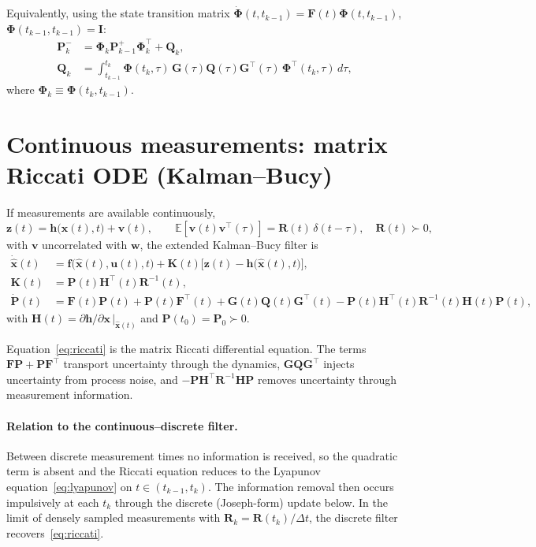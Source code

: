 \documentclass[]{article}
\newcommand{\x}{\bm{x}}
\newcommand{\xh}{\hat{\bm{x}}}
\newcommand{\z}{\bm{z}}
\newcommand{\Pm}{\mathbf{P}}
\newcommand{\Fm}{\mathbf{F}}
\newcommand{\Gm}{\mathbf{G}}
\newcommand{\Hm}{\mathbf{H}}
\newcommand{\Km}{\mathbf{K}}
\newcommand{\Qm}{\mathbf{Q}}
\newcommand{\Rm}{\mathbf{R}}
\newcommand{\Phim}{\bm{\Phi}}
\newcommand{\Id}{\mathbf{I}}
\begin{document}
Equivalently, using the state transition matrix
$\dot{\Phim}(t,t_{k-1}) = \Fm(t)\Phim(t,t_{k-1})$, $\Phim(t_{k-1},t_{k-1})=\Id$:
\begin{align}
  \Pm_k^- &= \Phim_k \Pm_{k-1}^+ \Phim_k^\top + \Qm_k, \\
  \Qm_k   &= \int_{t_{k-1}}^{t_k}
             \Phim(t_k,\tau)\,\Gm(\tau)\Qm(\tau)\Gm^\top(\tau)\,\Phim^\top(t_k,\tau)\,d\tau,
\end{align}
where $\Phim_k \equiv \Phim(t_k,t_{k-1})$.

\section*{Continuous measurements: matrix Riccati ODE (Kalman--Bucy)}
If measurements are available continuously,
\begin{equation}
  \z(t) = \bm{h}\big(\x(t),t\big) + \bm{v}(t), \qquad
  \mathbb{E}\!\left[\bm{v}(t)\bm{v}^\top(\tau)\right] = \Rm(t)\,\delta(t-\tau),
  \quad \Rm(t)\succ 0,
\end{equation}
with $\bm{v}$ uncorrelated with $\bm{w}$, the extended Kalman--Bucy filter is
\begin{align}
  \dot{\xh}(t) &= \bm{f}\big(\xh(t),\bm{u}(t),t\big)
                 + \Km(t)\Big[\z(t) - \bm{h}\big(\xh(t),t\big)\Big], \\
  \Km(t) &= \Pm(t)\Hm^\top(t)\Rm^{-1}(t), \\
  \dot{\Pm}(t) &= \Fm(t)\Pm(t) + \Pm(t)\Fm^\top(t) + \Gm(t)\Qm(t)\Gm^\top(t)
                 - \Pm(t)\Hm^\top(t)\Rm^{-1}(t)\Hm(t)\Pm(t),
  \label{eq:riccati}
\end{align}
with $\Hm(t) = \partial\bm{h}/\partial\x\,\big|_{\xh(t)}$ and
$\Pm(t_0) = \Pm_0 \succ 0$.

Equation~\eqref{eq:riccati} is the matrix Riccati differential equation.
The terms $\Fm\Pm + \Pm\Fm^\top$ transport uncertainty through the dynamics,
$\Gm\Qm\Gm^\top$ injects uncertainty from process noise, and
$-\Pm\Hm^\top\Rm^{-1}\Hm\Pm$ removes uncertainty through measurement information.

\paragraph{Relation to the continuous--discrete filter.}
Between discrete measurement times no information is received, so the
quadratic term is absent and the Riccati equation reduces to the Lyapunov
equation~\eqref{eq:lyapunov} on $t\in(t_{k-1},t_k)$. The information removal
then occurs impulsively at each $t_k$ through the discrete (Joseph-form)
update below. In the limit of densely sampled measurements with
$\Rm_k = \Rm(t_k)/\Delta t$, the discrete filter recovers~\eqref{eq:riccati}.
\end{document}
